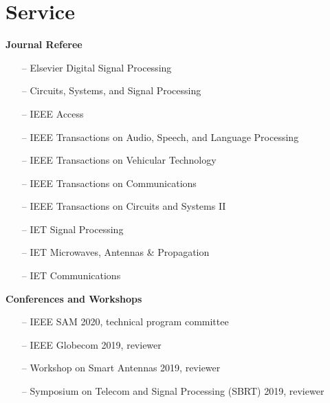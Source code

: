 \section{Service} 

{\bf Journal Referee}\\
\begin{itemize}
	\item[--] Elsevier Digital Signal Processing
	\item[--] Circuits, Systems, and Signal Processing
	\item[--] IEEE Access
	\item[--] IEEE Transactions on Audio, Speech, and Language Processing
	\item[--] IEEE Transactions on Vehicular Technology
	\item[--] IEEE Transactions on Communications
	\item[--] IEEE Transactions on Circuits and Systems II
	\item[--] IET Signal Processing
	\item[--] IET Microwaves, Antennas \& Propagation
	\item[--] IET Communications
\end{itemize}

{\bf Conferences and Workshops}\\
\begin{itemize}
	\item[--] IEEE SAM 2020, technical program committee
	\item[--] IEEE Globecom 2019, reviewer
	\item[--] Workshop on Smart Antennas 2019, reviewer
	\item[--] Symposium on Telecom and Signal Processing (SBRT) 2019, reviewer
\end{itemize}